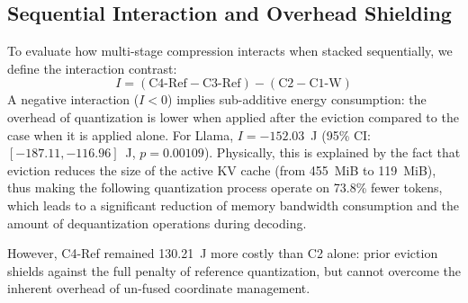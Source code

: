 \documentclass[sigconf,nonacm]{acmart}
\begin{document}
\begin{table}[htbp]
\caption{Registered Paired Tests at 4096 Tokens, Llama Total Energy}
\label{tab:llama-stats}
\centering\small
{}
\end{table}

\subsection{Sequential Interaction and Overhead Shielding}
\label{sec:interaction}

To evaluate how multi-stage compression interacts when stacked sequentially, we define the interaction contrast:
\begin{equation}
I = (\text{C4-Ref} - \text{C3-Ref}) - (\text{C2} - \text{C1-W})
\end{equation}
A negative interaction ($I < 0$) implies sub-additive energy consumption: the overhead of quantization is lower when applied after the eviction compared to the case when it is applied alone. For Llama, $I = -152.03$~J (95\% CI: $[-187.11, -116.96]$~J, $p = 0.00109$). Physically, this is explained by the fact that eviction reduces the size of the active KV cache (from 455~MiB to 119~MiB), thus making the following quantization process operate on 73.8\% fewer tokens, which leads to a significant reduction of memory bandwidth consumption and the amount of dequantization operations during decoding.

However, C4-Ref remained 130.21~J more costly than C2 alone: prior eviction shields against the full penalty of reference quantization, but cannot overcome the inherent overhead of un-fused coordinate management.
\end{document}
